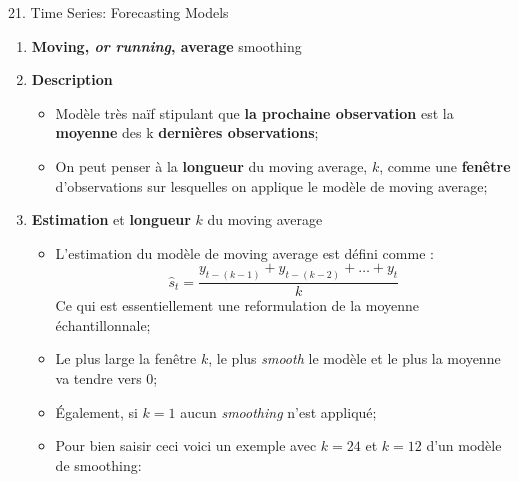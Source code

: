 \documentclass[12pt, titlepage, french]{report}
\begin{document}
\begin{CHPT_SUMM}[label = {timeseries21}]{21. Time Series: Forecasting Models}
\begin{enumerate}
	\item	\textbf{Moving, \textit{or running}, average} smoothing
	\item[]	\textbf{Description}
		\begin{itemize}
		\item	Modèle très naïf stipulant que \textbf{la prochaine observation} est la \textbf{moyenne} des k \textbf{dernières observations};
		\item	On peut penser à la \textbf{longueur} du moving average, $k$, comme une \textbf{fenêtre} d'observations sur lesquelles on applique le modèle de moving average;
		\end{itemize}
	\item[]	\textbf{Estimation} et \textbf{longueur} $k$ du moving average
		\begin{itemize}
		\item	L'estimation du modèle de moving average est défini comme :
			\begin{equation*}
			\hat{s}_{t}	
				=	\frac{y_{t - (k - 1)} + y_{t - (k - 2)} + \dots + y_{t}}{k}
			\end{equation*}
		Ce qui est essentiellement une reformulation de la moyenne échantillonnale;
		\item	Le plus large la fenêtre $k$, le plus \textit{smooth} le modèle et le plus la moyenne va tendre vers 0;
		\item[]	Également, si $k = 1$ aucun \textit{smoothing} n'est appliqué;
		\item	Pour bien saisir ceci voici un exemple avec $k = 24$ et $k = 12$ d'un modèle de smoothing:
		

\end{itemize}
\end{enumerate}
\end{CHPT_SUMM}
\end{document}
